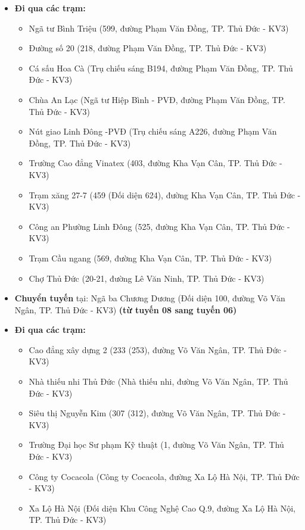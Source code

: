 \documentclass[a4paper,12pt]{article}
\begin{document}
\begin{itemize}
    \item \textbf{Đi qua các trạm:}
    \begin{itemize}
        \item Ngã tư Bình Triệu (599, đường Phạm Văn Đồng, TP. Thủ Đức - KV3)
        \item Đường số 20 (218, đường Phạm Văn Đồng, TP. Thủ Đức - KV3)
        \item Cá sấu Hoa Cà (Trụ chiếu sáng B194, đường Phạm Văn Đồng, TP. Thủ Đức - KV3)
        \item Chùa An Lạc (Ngã tư Hiệp Bình - PVĐ, đường Phạm Văn Đồng, TP. Thủ Đức - KV3)
        \item Nút giao Linh Đông -PVĐ (Trụ chiếu sáng A226, đường Phạm Văn Đồng, TP. Thủ Đức - KV3)
        \item Trường Cao đẳng Vinatex (403, đường Kha Vạn Cân, TP. Thủ Đức - KV3)
        \item Trạm xăng 27-7 (459 (Đối diện 624), đường Kha Vạn Cân, TP. Thủ Đức - KV3)
        \item Công an Phường Linh Đông (525, đường Kha Vạn Cân, TP. Thủ Đức - KV3)
        \item Trạm Cầu ngang (569, đường Kha Vạn Cân, TP. Thủ Đức - KV3)
        \item Chợ Thủ Đức (20-21, đường Lê Văn Ninh, TP. Thủ Đức - KV3)
    \end{itemize}
    
    \item \textbf{Chuyển tuyến} tại: Ngã ba Chương Dương (Đối diện 100, đường Võ Văn Ngân, TP. Thủ Đức - KV3) \textbf{(từ tuyến 08 sang tuyến 06)}
    
    \item \textbf{Đi qua các trạm:}
    \begin{itemize}
        \item Cao đẳng xây dựng 2 (233 (253), đường Võ Văn Ngân, TP. Thủ Đức - KV3)
        \item Nhà thiếu nhi Thủ Đức (Nhà thiếu nhi, đường Võ Văn Ngân, TP. Thủ Đức - KV3)
        \item Siêu thị Nguyễn Kim (307 (312), đường Võ Văn Ngân, TP. Thủ Đức - KV3)
        \item Trường Đại học Sư phạm Kỹ thuật (1, đường Võ Văn Ngân, TP. Thủ Đức - KV3)
        \item Công ty Cocacola (Công ty Cocacola, đường Xa Lộ Hà Nội, TP. Thủ Đức - KV3)
        \item Xa Lộ Hà Nội (Đối diện Khu Công Nghệ Cao Q.9, đường Xa Lộ Hà Nội, TP. Thủ Đức - KV3)
    \end{itemize}


\end{itemize}
\end{document}
